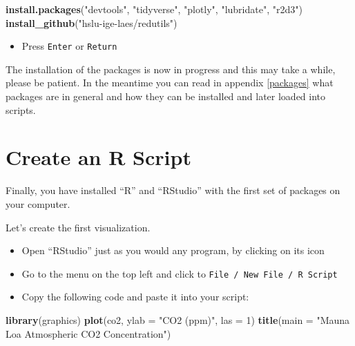 \documentclass[
]{book}
\newenvironment{Shaded}{\begin{snugshade}}{\end{snugshade}}
\newcommand{\DataTypeTok}[1]{\textcolor[rgb]{0.13,0.29,0.53}{#1}}
\newcommand{\DecValTok}[1]{\textcolor[rgb]{0.00,0.00,0.81}{#1}}
\newcommand{\KeywordTok}[1]{\textcolor[rgb]{0.13,0.29,0.53}{\textbf{#1}}}
\newcommand{\NormalTok}[1]{#1}
\newcommand{\StringTok}[1]{\textcolor[rgb]{0.31,0.60,0.02}{#1}}
\providecommand{\tightlist}{%
  \setlength{\itemsep}{0pt}\setlength{\parskip}{0pt}}
\let\oldShaded\Shaded
\let\endoldShaded\endShaded
\renewenvironment{Shaded}{\footnotesize\oldShaded}{\endoldShaded}
\begin{document}
\begin{Shaded}
\begin{Highlighting}[]
\KeywordTok{install.packages}\NormalTok{(}\StringTok{"devtools"}\NormalTok{, }\StringTok{"tidyverse"}\NormalTok{, }\StringTok{"plotly"}\NormalTok{, }\StringTok{"lubridate"}\NormalTok{, }\StringTok{"r2d3"}\NormalTok{)}
\KeywordTok{install_github}\NormalTok{(}\StringTok{"hslu-ige-laes/redutils"}\NormalTok{)}
\end{Highlighting}
\end{Shaded}

\begin{itemize}
\tightlist
\item
  Press \texttt{Enter} or \texttt{Return}
\end{itemize}

The installation of the packages is now in progress and this may take a while, please be patient. In the meantime you can read in appendix \ref{packages} what packages are in general and how they can be installed and later loaded into scripts.

\hypertarget{create-an-r-script}{%
\section{Create an R Script}\label{create-an-r-script}}

Finally, you have installed ``R'' and ``RStudio'' with the first set of packages on your computer.

Let's create the first visualization.

\begin{itemize}
\item
  Open ``RStudio'' just as you would any program, by clicking on its icon
\item
  Go to the menu on the top left and click to \texttt{File\ /\ New\ File\ /\ R\ Script}
\item
  Copy the following code and paste it into your script:
\end{itemize}

\begin{Shaded}
\begin{Highlighting}[]
\KeywordTok{library}\NormalTok{(graphics)}
\KeywordTok{plot}\NormalTok{(co2, }\DataTypeTok{ylab =} \StringTok{"CO2 (ppm)"}\NormalTok{, }\DataTypeTok{las =} \DecValTok{1}\NormalTok{)}
\KeywordTok{title}\NormalTok{(}\DataTypeTok{main =} \StringTok{"Mauna Loa Atmospheric CO2 Concentration"}\NormalTok{)}
\end{Highlighting}
\end{Shaded}
\end{document}

